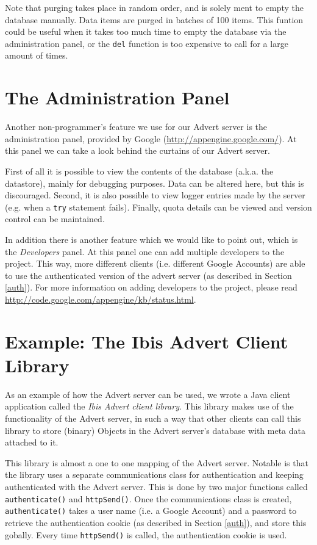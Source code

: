 \documentclass[a4paper,10pt]{article}
\begin{document}
Note that purging takes place in random order, and is solely ment to empty the
database manually. Data items are purged in batches of 100 items. This funtion 
could be useful when it takes too much time to empty the database via the
administration panel, or the \texttt{del} function is too expensive to call for
a large amount of times.

\section{The Administration Panel}
\label{admin-panel}
Another non-programmer's feature we use for our Advert server is the
administration panel, provided by Google (\url{http://appengine.google.com/}).
At this panel we can take a look behind the curtains of our Advert server.

First of all it is possible to view the contents of the database (a.k.a. the
datastore), mainly for debugging purposes. Data can be altered here, but this
is discouraged. Second, it is also possible to view logger entries made by the
server (e.g. when a \texttt{try} statement fails). Finally, quota details can
be viewed and version control can be maintained.

In addition there is another feature which we would like to point out, which is
the \emph{Developers} panel. At this panel one can add multiple developers to
the project. This way, more different clients (i.e. different Google Accounts)
are able to use the authenticated version of the advert server (as described in
Section \ref{auth}). For more information on adding developers to the project,
please read \url{http://code.google.com/appengine/kb/status.html}.

\section{Example: The Ibis Advert Client Library}
\label{advert-lib}
As an example of how the Advert server can be used, we wrote a Java client
application called the \emph{Ibis Advert client library}. This library makes use
of the functionality of the Advert server, in such a way that other clients can
call this library to store (binary) Objects in the Advert server's database
with meta data attached to it.

This library is almost a one to one mapping of the Advert server. Notable is
that the library uses a separate communications class for authentication and
keeping authenticated with the Advert server. This is done by two major
functions called \texttt{authenticate()} and \texttt{httpSend()}. Once the
communications class is created,  \texttt{authenticate()} takes a user name
(i.e. a Google Account) and a password to retrieve the authentication cookie
(as described in Section \ref{auth}), and store this gobally. Every time
\texttt{httpSend()} is called, the authentication cookie is used.
\end{document}

